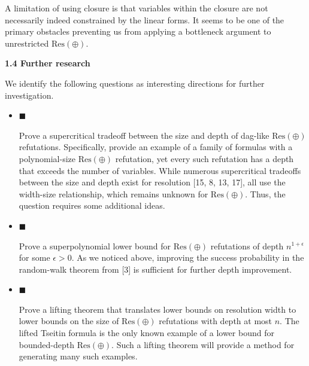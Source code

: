 \documentclass[10pt,a4paper]{article}
\begin{document}
A limitation of using closure is that variables within the closure are not necessarily indeed constrained by the linear forms. It seems to be one of the primary obstacles preventing us from applying a bottleneck argument to unrestricted $\mathrm{Res}(\oplus)$.\par


\par\medskip\noindent\textbf{
1.4 Further research}\par


We identify the following questions as interesting directions for further investigation.\par


\begin{itemize}


\item 
$\blacksquare$ 


Prove a supercritical tradeoff between the size and depth of dag-like $\mathrm{Res}(\oplus)$ refutations. Specifically, provide an example of a family of formulas with a polynomial-size $\mathrm{Res}(\oplus)$ refutation, yet every such refutation has a depth that exceeds the number of variables. While numerous supercritical tradeoffs between the size and depth exist for resolution [15, 8, 13, 17], all use the width-size relationship, which remains unknown for $\mathrm{Res}(\oplus)$. Thus, the question requires some additional ideas.\par





\item 
$\blacksquare$ 


Prove a superpolynomial lower bound for $\mathrm{Res}(\oplus)$ refutations of depth $n^{1+\epsilon}$ for some $\epsilon>0$. As we noticed above, improving the success probability in the random-walk theorem from [3] is sufficient for further depth improvement.\par





\item 
$\blacksquare$ 


Prove a lifting theorem that translates lower bounds on resolution width to lower bounds on the size of $\mathrm{Res}(\oplus)$ refutations with depth at most $n$. The lifted Tseitin formula is the only known example of a lower bound for bounded-depth $\mathrm{Res}(\oplus)$. Such a lifting theorem will provide a method for generating many such examples.\par





\end{itemize}
\end{document}
